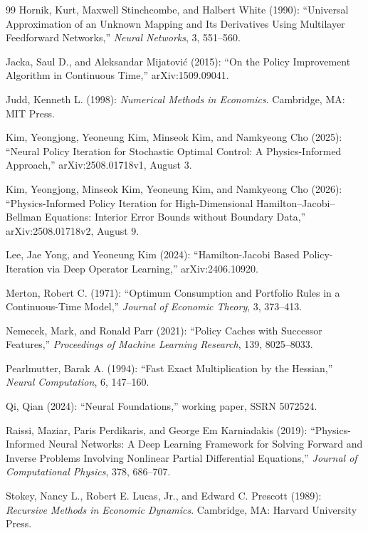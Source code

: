 \begin{thebibliography}{99}
Hornik, Kurt, Maxwell Stinchcombe, and Halbert White (1990): ``Universal Approximation of an Unknown Mapping and Its Derivatives Using Multilayer Feedforward Networks,'' \emph{Neural Networks}, 3, 551--560.

Jacka, Saul D., and Aleksandar Mijatovi\'c (2015): ``On the Policy Improvement Algorithm in Continuous Time,'' arXiv:1509.09041.

Judd, Kenneth L. (1998): \emph{Numerical Methods in Economics}. Cambridge, MA: MIT Press.

Kim, Yeongjong, Yeoneung Kim, Minseok Kim, and Namkyeong Cho (2025): ``Neural Policy Iteration for Stochastic Optimal Control: A Physics-Informed Approach,'' arXiv:2508.01718v1, August 3.

Kim, Yeongjong, Minseok Kim, Yeoneung Kim, and Namkyeong Cho (2026): ``Physics-Informed Policy Iteration for High-Dimensional Hamilton--Jacobi--Bellman Equations: Interior Error Bounds without Boundary Data,'' arXiv:2508.01718v2, August 9.

Lee, Jae Yong, and Yeoneung Kim (2024): ``Hamilton-Jacobi Based Policy-Iteration via Deep Operator Learning,'' arXiv:2406.10920.

Merton, Robert C. (1971): ``Optimum Consumption and Portfolio Rules in a Continuous-Time Model,'' \emph{Journal of Economic Theory}, 3, 373--413.

Nemecek, Mark, and Ronald Parr (2021): ``Policy Caches with Successor Features,'' \emph{Proceedings of Machine Learning Research}, 139, 8025--8033.

Pearlmutter, Barak A. (1994): ``Fast Exact Multiplication by the Hessian,'' \emph{Neural Computation}, 6, 147--160.

Qi, Qian (2024): ``Neural Foundations,'' working paper, SSRN 5072524.

Raissi, Maziar, Paris Perdikaris, and George Em Karniadakis (2019): ``Physics-Informed Neural Networks: A Deep Learning Framework for Solving Forward and Inverse Problems Involving Nonlinear Partial Differential Equations,'' \emph{Journal of Computational Physics}, 378, 686--707.

Stokey, Nancy L., Robert E. Lucas, Jr., and Edward C. Prescott (1989): \emph{Recursive Methods in Economic Dynamics}. Cambridge, MA: Harvard University Press.

\end{thebibliography}
